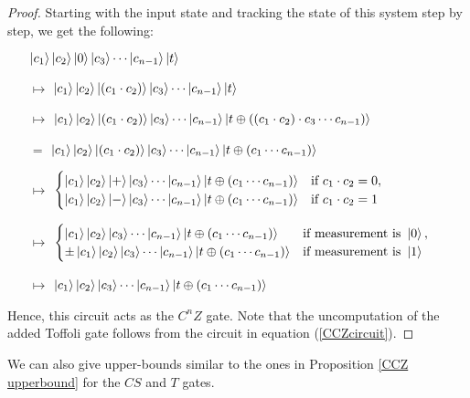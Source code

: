 \documentclass[12pt]{dalthesis}
\begin{document}
\begin{proof}
Starting with the input state and tracking the state of this system step by step, we get the following: 
\begin{itemize}
\item[] $\ket{c_1}\ket{c_2}\ket{0}\ket{c_3} \cdots \ket{c_{n-1}}\ket{t}$
\item[$\mapsto$] $\ket{c_1}\ket{c_2}\ket{(c_1 \cdot c_2)}\ket{c_3} \cdots \ket{c_{n-1}}\ket{t}$
\item[$\mapsto$] $\ket{c_1}\ket{c_2}\ket{(c_1 \cdot c_2)}\ket{c_3} \cdots \ket{c_{n-1}} \ket{t \oplus ((c_1 \cdot c_2) \cdot c_3 \cdots c_{n-1})}$
\item[$=$] $\ket{c_1}\ket{c_2}\ket{(c_1 \cdot c_2)}\ket{c_3} \cdots \ket{c_{n-1}} \ket{t \oplus (c_1 \cdots c_{n-1})}$
\item[$\mapsto$] $\begin{cases} \ket{c_1}\ket{c_2}\ket{+}\ket{c_3} \cdots \ket{c_{n-1}} \ket{t \oplus (c_1 \cdots c_{n-1})} & \mbox{if } c_1 \cdot c_2 = 0, \\
\ket{c_1}\ket{c_2}\ket{-}\ket{c_3} \cdots \ket{c_{n-1}} \ket{t \oplus (c_1 \cdots c_{n-1})} & \mbox{if } c_1 \cdot c_2 = 1 \end{cases}$
\item[$\mapsto$] $\begin{cases} \ket{c_1}\ket{c_2}\ket{c_3} \cdots \ket{c_{n-1}} \ket{t \oplus (c_1 \cdots c_{n-1})} & \mbox{if measurement is } \ket{0} , \\
\pm \ket{c_1}\ket{c_2}\ket{c_3} \cdots \ket{c_{n-1}} \ket{t \oplus (c_1 \cdots c_{n-1})} & \mbox{if measurement is } \ket{1} \end{cases}$
\item[$\mapsto$] $\ket{c_1}\ket{c_2}\ket{c_3} \cdots \ket{c_{n-1}}\ket{t \oplus (c_1 \cdots c_{n-1})}$
\end{itemize}
Hence, this circuit acts as the $C^nZ$ gate. Note that the uncomputation of the added Toffoli gate follows from the circuit in equation (\ref{CCZcircuit}).
\end{proof}


We can also give upper-bounds similar to the ones in Proposition \ref{CCZ upperbound} for the $CS$ and $T$ gates.
\end{document}
